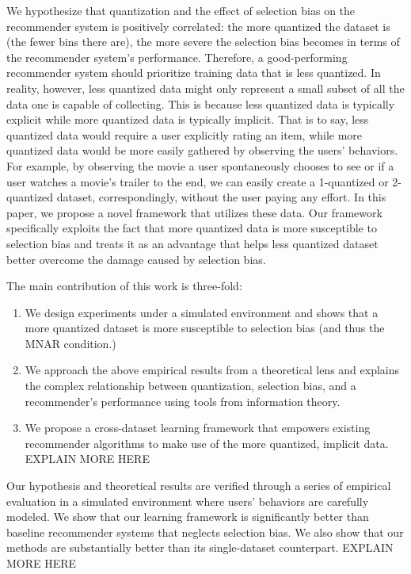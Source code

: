 \documentclass[12pt, letterpaper]{article}
\theoremstyle{definition}\newtheorem*{definition}{Definition}
\theoremstyle{definition}\newtheorem*{example}{Example}
\theoremstyle{definition}\newtheorem*{remark}{Remark}
\begin{document}
We hypothesize that quantization and the effect of selection bias on the recommender system is positively correlated: the more quantized the dataset is (the fewer bins there are), the more severe the selection bias becomes in terms of the recommender system's performance. Therefore, a good-performing recommender system should prioritize training data that is less quantized. In reality, however, less quantized data might only represent a small subset of all the data one is capable of collecting. This is because less quantized data is typically explicit while more quantized data is typically implicit. That is to say, less quantized data would require a user explicitly rating an item, while more quantized data would be more easily gathered by observing the users' behaviors. For example, by observing the movie a user spontaneously chooses to see or if a user watches a movie's trailer to the end, we can easily create a 1-quantized or 2-quantized dataset, correspondingly, without the user paying any effort. In this paper, we propose a novel framework that utilizes these data. Our framework specifically exploits the fact that more quantized data is more susceptible to selection bias and treats it as an advantage that helps less quantized dataset better overcome the damage caused by selection bias.

The main contribution of this work is three-fold:
\begin{enumerate}
    \item We design experiments under a simulated environment and shows that a more quantized dataset is more susceptible to selection bias (and thus the MNAR condition.)
    \item We approach the above empirical results from a theoretical lens and explains the complex relationship between quantization, selection bias, and a recommender's performance using tools from information theory.
    \item We propose a cross-dataset learning framework that empowers existing recommender algorithms to make use of the more quantized, implicit data. EXPLAIN MORE HERE
\end{enumerate}

Our hypothesis and theoretical results are verified through a series of empirical evaluation in a simulated environment where users' behaviors are carefully modeled. We show that our learning framework is significantly better than baseline recommender systems that neglects selection bias. We also show that our methods are substantially better than its single-dataset counterpart. EXPLAIN MORE HERE
\end{document}
